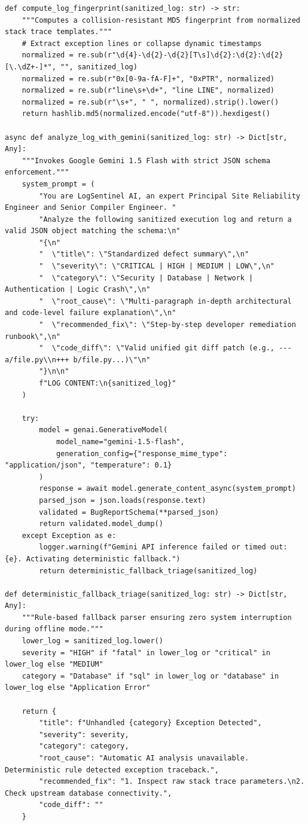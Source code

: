 \documentclass[12pt,a4paper]{article}
\begin{document}
\begin{lstlisting}[style=pystyle, caption={Production NLP Sanitization, Deduplication, and Gemini AI Triage Engine}]
def compute_log_fingerprint(sanitized_log: str) -> str:
    """Computes a collision-resistant MD5 fingerprint from normalized stack trace templates."""
    # Extract exception lines or collapse dynamic timestamps
    normalized = re.sub(r"\d{4}-\d{2}-\d{2}[T\s]\d{2}:\d{2}:\d{2}[\.\dZ+-]*", "", sanitized_log)
    normalized = re.sub(r"0x[0-9a-fA-F]+", "0xPTR", normalized)
    normalized = re.sub(r"line\s+\d+", "line LINE", normalized)
    normalized = re.sub(r"\s+", " ", normalized).strip().lower()
    return hashlib.md5(normalized.encode("utf-8")).hexdigest()

async def analyze_log_with_gemini(sanitized_log: str) -> Dict[str, Any]:
    """Invokes Google Gemini 1.5 Flash with strict JSON schema enforcement."""
    system_prompt = (
        "You are LogSentinel AI, an expert Principal Site Reliability Engineer and Senior Compiler Engineer. "
        "Analyze the following sanitized execution log and return a valid JSON object matching the schema:\n"
        "{\n"
        "  \"title\": \"Standardized defect summary\",\n"
        "  \"severity\": \"CRITICAL | HIGH | MEDIUM | LOW\",\n"
        "  \"category\": \"Security | Database | Network | Authentication | Logic Crash\",\n"
        "  \"root_cause\": \"Multi-paragraph in-depth architectural and code-level failure explanation\",\n"
        "  \"recommended_fix\": \"Step-by-step developer remediation runbook\",\n"
        "  \"code_diff\": \"Valid unified git diff patch (e.g., --- a/file.py\\n+++ b/file.py...)\"\n"
        "}\n\n"
        f"LOG CONTENT:\n{sanitized_log}"
    )

    try:
        model = genai.GenerativeModel(
            model_name="gemini-1.5-flash",
            generation_config={"response_mime_type": "application/json", "temperature": 0.1}
        )
        response = await model.generate_content_async(system_prompt)
        parsed_json = json.loads(response.text)
        validated = BugReportSchema(**parsed_json)
        return validated.model_dump()
    except Exception as e:
        logger.warning(f"Gemini API inference failed or timed out: {e}. Activating deterministic fallback.")
        return deterministic_fallback_triage(sanitized_log)

def deterministic_fallback_triage(sanitized_log: str) -> Dict[str, Any]:
    """Rule-based fallback parser ensuring zero system interruption during offline mode."""
    lower_log = sanitized_log.lower()
    severity = "HIGH" if "fatal" in lower_log or "critical" in lower_log else "MEDIUM"
    category = "Database" if "sql" in lower_log or "database" in lower_log else "Application Error"
    
    return {
        "title": f"Unhandled {category} Exception Detected",
        "severity": severity,
        "category": category,
        "root_cause": "Automatic AI analysis unavailable. Deterministic rule detected exception traceback.",
        "recommended_fix": "1. Inspect raw stack trace parameters.\n2. Check upstream database connectivity.",
        "code_diff": ""
    }
\end{lstlisting}
\end{document}
